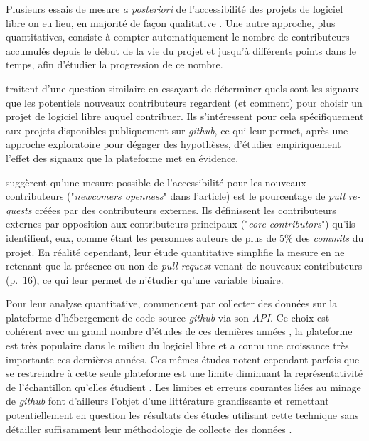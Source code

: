 \documentclass[dvipsnames,runningheads]{llncs}
\newcommand{\en}[1]{\foreignlanguage{english}{\emph{#1}}}
\begin{document}
    \label{sec:accessibility-measure}
    Plusieurs essais de mesure \emph{a posteriori} de l'accessibilité des projets de logiciel libre on eu
    lieu, en majorité de façon qualitative
    \parencites{newcomers-accessibility-2016}{newcomers-onboarding-2018}[voir
    aussi][]{newcomers-adaptation-2005}. Une autre approche, plus quantitatives, consiste à compter
    automatiquement le nombre de contributeurs accumulés depuis le début de la vie du projet et jusqu'à
    différents points dans le temps, afin d'étudier la progression de ce nombre\cite{contributor-count-2006}.

    \textcite{signals-2019} traitent d'une question similaire en essayant de déterminer quels sont les signaux
    que les potentiels nouveaux contributeurs regardent (et comment) pour choisir un projet de logiciel libre
    auquel contribuer. Ils s'intéressent pour cela spécifiquement aux projets disponibles publiquement sur
    \en{github}, ce qui leur permet, après une approche exploratoire pour dégager des hypothèses, d'étudier
    empiriquement l'effet des signaux que la plateforme met en évidence.

    \textcite{signals-2019} suggèrent qu'une mesure possible de l'accessibilité pour les nouveaux
    contributeurs ("\en{newcomers openness}" dans l'article) est le pourcentage de \en{pull requests} créées
    par des contributeurs externes. Ils définissent les contributeurs externes par opposition aux
    contributeurs principaux ("\en{core contributors}") qu'ils identifient, eux, comme étant les personnes
    auteurs de plus de 5\% des \en{commits} du projet. En réalité cependant, leur étude quantitative simplifie
    la mesure en ne retenant que la présence ou non de \en{pull request} venant de nouveaux contributeurs
    (p.~16), ce qui leur permet de n'étudier qu'une variable binaire.

    Pour leur analyse quantitative, \textcite{signals-2019} commencent par collecter des données sur la
    plateforme d'hébergement de code source \en{github} via son \en{API}. Ce choix est cohérent avec un grand
    nombre d'études de ces dernières années \parencite{github-mapping-2017}, la plateforme est très populaire
    dans le milieu du logiciel libre et a connu une croissance très importante ces dernières années. Ces mêmes
    études notent cependant parfois que se restreindre à cette seule plateforme est une limite diminuant la
    représentativité de l'échantillon qu'elles étudient \parencite{swh-growth-2019}. Les limites et erreurs
    courantes liées au minage de \en{github} font d'ailleurs l'objet d'une littérature grandissante et
    remettant potentiellement en question les résultats des études utilisant cette technique sans détailler
    suffisamment leur méthodologie de collecte des données \parencite{mining-github-2014,penumbra-oss-2022}.
\end{document}
